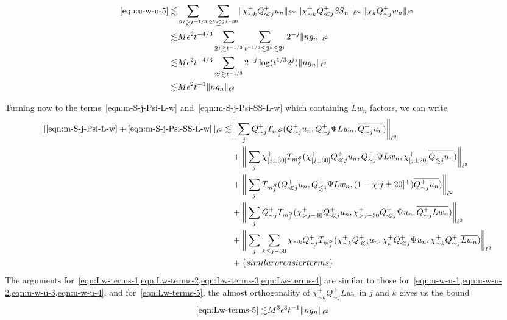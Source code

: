 \documentclass[letterpaper, reqno,final]{amsart}
\newcommand{\cS}{\mathcal{S}}
\newcommand{\mSS}{\mathit{SS}}
\newcommand{\btext}[1]{\left\{\textup{#1}\right\}}
\newcommand{\bsime}{\btext{similar or easier terms}}
\begin{document}
\begin{equation*}\begin{split}
    \eqref{eqn:u-w-u-5} \lesssim& \sum_{2^j \gtrsim t^{-1/3}}\sum_{2^k \leq 2^{j - 30}} \lVert \chi_{\sim k}^+ Q_{\ll j}^+ u_n \rVert_{\ell^\infty} \lVert \chi_{\sim k}^+ Q_{\ll j}^+ \mSS_n \rVert_{\ell^\infty} \lVert \chi_{k} Q_{\sim j}^+ w_n \rVert_{\ell^2}\\
    \lesssim& M\epsilon^2  t^{-4/3}  \sum_{2^j \gtrsim t^{-1/3}} \sum_{t^{-1/3} \lesssim 2^k \lesssim 2^j}2^{-j} \lVert n g_n \rVert_{\ell^2}\\
    \lesssim& M \epsilon^2 t^{-4/3} \sum_{2^j \gtrsim t^{-1/3}} 2^{-j} \log(t^{1/3} 2^j) \lVert n g_n \rVert_{\ell^2}\\
    \lesssim& M \epsilon^2 t^{-1} \lVert ng_n \rVert_{\ell^2}
\end{split}
\end{equation*}

Turning now to the terms~\eqref{eqn:m-S-j-Psi-L-w} and~\eqref{eqn:m-S-j-Psi-SS-L-w} which containing $Lw_n$ factors, we can write
\begin{subequations}\begin{align}
    \lVert \eqref{eqn:m-S-j-Psi-L-w} + \eqref{eqn:m-S-j-Psi-SS-L-w}\rVert_{\ell^2} \lesssim& \bigg\lVert \sum_j Q_{\sim j}^+ T_{m^\cS_j}(Q_{\sim j}^+ u_n, Q_{\sim j}^+ \Psi L w_n, \overline{Q_{\sim j}^+ u_n}) \bigg \rVert_{\ell^2}\label{eqn:Lw-terms-1}\\
    &+ \bigg\lVert \sum_j \chi_{[j\pm 30]}^+ T_{m^\cS_j}(\chi_{[j\pm 30]}^+ Q_{\ll j}^+ u_n, Q_{\sim j}^+ \Psi L w_n, \chi_{[j\pm 20]}^+\overline{Q_{\lesssim j}^+ u_n}) \bigg \rVert_{\ell^2}\label{eqn:Lw-terms-2}\\
    &+ \bigg\lVert \sum_j T_{m^\cS_j}( Q_{\ll j}^+ u_n, Q_{\lesssim j}^+ \Psi L w_n, (1 - \chi_[j\pm 20]^+)\overline{Q_{\sim j}^+ u_n}) \bigg \rVert_{\ell^2}\label{eqn:Lw-terms-3}\\
    &+ \bigg\lVert \sum_j Q_{\sim j}^+ T_{m^\cS_j}(\chi_{> j - 40}^+ Q_{\ll j}^+ u_n, \chi_{> j - 30}^+ Q_{\ll j}^+ \Psi u_n, \overline{Q_{\sim j}^+ L w_n}) \bigg \rVert_{\ell^2}\label{eqn:Lw-terms-4}\\
    &+ \bigg\lVert \sum_j \sum_{k \leq j - 30}  \chi_{\sim k} Q_{\sim j}^+ T_{m^\cS_j}(\chi_{\sim k}^+ Q_{\ll j}^+ u_n, \chi_{k}^+ Q_{\ll j}^+ \Psi u_n,\chi_{\sim k}^+ Q_{\sim j}^+\overline{ L w_n}) \bigg \rVert_{\ell^2}\label{eqn:Lw-terms-5}\\
    &+\bsime \nonumber
\end{align}
\end{subequations}
The arguments for~\cref{eqn:Lw-terms-1,eqn:Lw-terms-2,eqn:Lw-terms-3,eqn:Lw-terms-4} are similar to those for~\cref{eqn:u-w-u-1,eqn:u-w-u-2,eqn:u-w-u-3,eqn:u-w-u-4}, and for~\eqref{eqn:Lw-terms-5}, the almost orthogonality of $\chi_{\sim k}^+ Q_{\sim j}^+\overline{L w_n}$ in $j$ and $k$ gives us the bound
\begin{equation*}\begin{split}
    \eqref{eqn:Lw-terms-5} \lesssim& M^3\epsilon^3 t^{-1}\lVert ng_n \rVert_{\ell^2}
\end{split}
\end{equation*}
\end{document}

